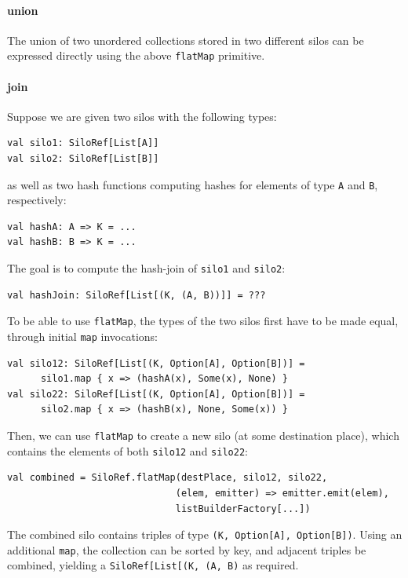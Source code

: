 \documentclass[preprint]{sigplanconf}
\theoremstyle{definition}
\theoremstyle{definition}
\begin{document}
\paragraph{union}
The union of two unordered collections stored in two different silos can be
expressed directly using the above \verb|flatMap| primitive.


\paragraph{join}
Suppose we are given two silos with the following types:

\begin{lstlisting}
val silo1: SiloRef[List[A]]
val silo2: SiloRef[List[B]]
\end{lstlisting}

\noindent as well as two hash functions computing hashes for elements of
type \verb|A| and \verb|B|, respectively:

\begin{lstlisting}
val hashA: A => K = ...
val hashB: B => K = ...
\end{lstlisting}

The goal is to compute the hash-join of \verb|silo1| and \verb|silo2|:

\begin{lstlisting}
val hashJoin: SiloRef[List[(K, (A, B))]] = ???
\end{lstlisting}

To be able to use \verb|flatMap|, the types of the two silos first have to be
made equal, through initial \verb|map| invocations:


\begin{lstlisting}
val silo12: SiloRef[List[(K, Option[A], Option[B])] =
      silo1.map { x => (hashA(x), Some(x), None) }
val silo22: SiloRef[List[(K, Option[A], Option[B])] =
      silo2.map { x => (hashB(x), None, Some(x)) }
\end{lstlisting}

Then, we can use \verb|flatMap| to create a new silo (at some destination
place), which contains the elements of both \verb|silo12| and \verb|silo22|:

\begin{lstlisting}
val combined = SiloRef.flatMap(destPlace, silo12, silo22,
                              (elem, emitter) => emitter.emit(elem),
                              listBuilderFactory[...])
\end{lstlisting}

The combined silo contains triples of type \verb|(K, Option[A], Option[B])|.
Using an additional \verb|map|, the collection can be sorted by key, and adjacent
triples be combined, yielding a \texttt{SiloRef[List[(K, (A, B)} as required.
\end{document}
